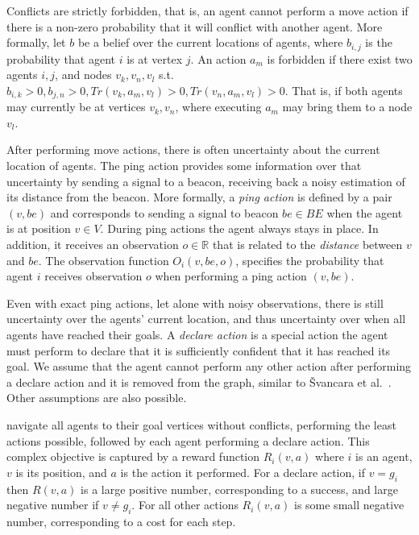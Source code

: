 \documentclass[letterpaper]{article} %
\newcommand{\shortcite}[1]{{\cite{#1}}}
\begin{document}
Conflicts are strictly forbidden, that is, an agent cannot perform a move action if there is a non-zero probability that it will conflict with another agent.  More formally, let $b$ be a belief over the current locations of agents, where $b_{i,j}$ is the probability that agent $i$ is at vertex $j$.
An action $a_m$ is forbidden if there exist two agents $i,j$, and nodes $v_{k},v_{n},v_{l}$ s.t.
$b_{i,k}>0, b_{j,n}>0, Tr(v_k,a_m,v_l)>0, Tr(v_n,a_m,v_l)>0 $. That is, if both agents may currently be at vertices $v_k,v_n$, where executing $a_m$ may bring them to a node $v_l$.



 After performing move actions, there is often uncertainty about the current location of agents. The ping action provides some information over that uncertainty by sending a signal to a beacon, receiving back a noisy estimation of its distance from the beacon.
More formally, a \emph{ping action} is defined by a pair $(v,be)$ and corresponds to sending a signal to beacon $be\in BE$ when the agent is at position $v\in V$. During ping actions the agent always stays in place.
In addition, it receives an observation $o\in\mathbb{R}$ that is related to the \emph{distance} between $v$ and $be$. The  observation function $O_i(v,be,o)$, specifies the probability that agent $i$ receives observation $o$ when performing a ping action $(v,be)$.

Even with exact ping actions, let alone with noisy observations, there is still uncertainty over the agents' current location, and thus uncertainty over when all agents have reached their goals.
A \emph{declare action} is a special action the agent must perform to declare that it is sufficiently confident that it has reached its goal. We assume that the agent cannot perform any other action after performing a declare action and it is removed from the graph, similar to  {\v{S}}vancara et al.~\shortcite{vsvancara2019online}. Other assumptions are also possible.

navigate all agents to their goal vertices without conflicts, performing the least actions possible, followed by each agent performing a declare action.
This complex objective is captured by a reward function $R_i(v,a)$ where $i$ is an agent, $v$ is its position, and $a$ is the action it performed.
For a declare action, if $v=g_i$ then $R(v,a)$ is a large positive number, corresponding to a success, and large negative number if $v \neq g_i$.  For all other actions $R_i(v,a)$ is some small negative number, corresponding to a cost for each step.
\end{document}
